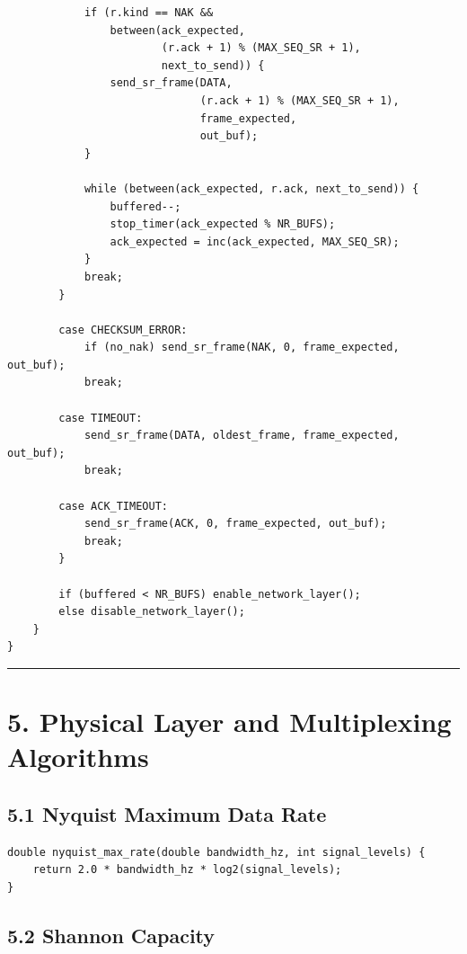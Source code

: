 \documentclass[11pt]{article}
\begin{document}
\begin{verbatim}
            if (r.kind == NAK &&
                between(ack_expected,
                        (r.ack + 1) % (MAX_SEQ_SR + 1),
                        next_to_send)) {
                send_sr_frame(DATA,
                              (r.ack + 1) % (MAX_SEQ_SR + 1),
                              frame_expected,
                              out_buf);
            }

            while (between(ack_expected, r.ack, next_to_send)) {
                buffered--;
                stop_timer(ack_expected % NR_BUFS);
                ack_expected = inc(ack_expected, MAX_SEQ_SR);
            }
            break;
        }

        case CHECKSUM_ERROR:
            if (no_nak) send_sr_frame(NAK, 0, frame_expected, out_buf);
            break;

        case TIMEOUT:
            send_sr_frame(DATA, oldest_frame, frame_expected, out_buf);
            break;

        case ACK_TIMEOUT:
            send_sr_frame(ACK, 0, frame_expected, out_buf);
            break;
        }

        if (buffered < NR_BUFS) enable_network_layer();
        else disable_network_layer();
    }
}
\end{verbatim}

\begin{center}\rule{0.5\linewidth}{0.5pt}\end{center}

\section{5. Physical Layer and Multiplexing
Algorithms}\label{physical-layer-and-multiplexing-algorithms}

\subsection{5.1 Nyquist Maximum Data
Rate}\label{nyquist-maximum-data-rate}

\begin{verbatim}
double nyquist_max_rate(double bandwidth_hz, int signal_levels) {
    return 2.0 * bandwidth_hz * log2(signal_levels);
}
\end{verbatim}

\subsection{5.2 Shannon Capacity}\label{shannon-capacity}
\end{document}
